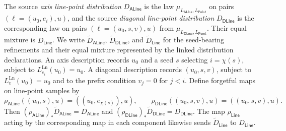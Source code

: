 \begin{definition}\label{def:line-point-dist}
	\leanok
	The source \emph{axis line-point distribution} $D_{\mathsf{ALine}}$ is
	the law $\mu_{L_{\mathsf{ALine}}, L_{\mathsf{Point}}}$ on pairs
	$(\ell=(u_0,e_i),u)$, and the source \emph{diagonal line-point
	distribution} $D_{\mathsf{DLine}}$ is the corresponding law on pairs
	$(\ell=(u_0,s,v),u)$ from
	$\mu_{L_{\mathsf{DLine}}, L_{\mathsf{Point}}}$. Their equal mixture is
	$D_{\mathsf{Line}}$. We write
	$\widetilde D_{\mathsf{ALine}}$, $\widetilde D_{\mathsf{DLine}}$, and
	$\widetilde D_{\mathsf{Line}}$ for the seed-bearing refinements and their
	equal mixture represented by the linked distribution declarations. An axis
	description records $u_0$ and a seed $s$ selecting $i=\chi(s)$, subject to
	$L^{\mathrm{Ln}}_{e_i}(u_0)=u_0$. A diagonal description records
	$(u_0,s,v)$, subject to $L^{\mathrm{Ln}}_v(u_0)=u_0$ and to the prefix
	condition $v_j=0$ for $j<i$. Define forgetful maps on line-point samples by
	\[
		\rho_{\mathsf{ALine}}((u_0,s),u)
		=((u_0,e_{\chi(s)}),u),
		\qquad
		\rho_{\mathsf{DLine}}((u_0,s,v),u)=((u_0,s,v),u).
	\]
	Then $(\rho_{\mathsf{ALine}})_*\widetilde D_{\mathsf{ALine}}
	=D_{\mathsf{ALine}}$ and
	$(\rho_{\mathsf{DLine}})_*\widetilde D_{\mathsf{DLine}}
	=D_{\mathsf{DLine}}$. The map $\rho_{\mathsf{Line}}$ acting by the
	corresponding map in each component likewise sends
	$\widetilde D_{\mathsf{Line}}$ to $D_{\mathsf{Line}}$.
\end{definition}

